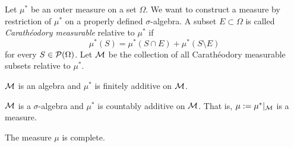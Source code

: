 \documentclass{../../large}
\begin{document}
\begin{prb}
Let $\mu^*$ be an outer measure on a set $\Omega$.
We want to construct a measure by restriction of $\mu^*$ on a properly defined $\sigma$-algebra.
A subset $E\subset\Omega$ is called \emph{Carath\'eodory measurable} relative to $\mu^*$ if
\[\mu^*(S)=\mu^*(S\cap E)+\mu^*(S\setminus E)\]
for every $S\in\mathcal{P}(\Omega)$.
Let $\mathcal{M}$ be the collection of all Carath\'eodory measurable subsets relative to $\mu^*$.
\begin{parts}
\item $\mathcal{M}$ is an algebra and $\mu^*$ is finitely additive on $\mathcal{M}$.
\item $\mathcal{M}$ is a $\sigma$-algebra and $\mu^*$ is countably additive on $\mathcal{M}$. That is, $\mu:=\mu^*|_{\mathcal{M}}$ is a measure.
\item The measure $\mu$ is complete.
\end{parts}
\end{prb}
\begin{pf}
\end{pf}
\end{document}
